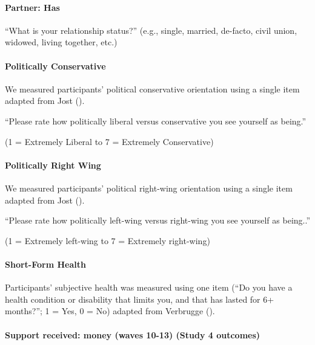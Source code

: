 \documentclass[
  single column]{article}
\let\oldparagraph\paragraph
\renewcommand{\paragraph}[1]{\oldparagraph{#1}\mbox{}}
\begin{document}
\paragraph{Partner: Has}\label{partner-has}

``What is your relationship status?'' (e.g., single, married, de-facto,
civil union, widowed, living together, etc.)

\paragraph{Politically Conservative}\label{politically-conservative}

We measured participants' political conservative orientation using a
single item adapted from Jost ().

``Please rate how politically liberal versus conservative you see
yourself as being.''

(1 = Extremely Liberal to 7 = Extremely Conservative)

\paragraph{Politically Right Wing}\label{politically-right-wing}

We measured participants' political right-wing orientation using a
single item adapted from Jost ().

``Please rate how politically left-wing versus right-wing you see
yourself as being..''

(1 = Extremely left-wing to 7 = Extremely right-wing)

\paragraph{Short-Form Health}\label{short-form-health}

Participants' subjective health was measured using one item (``Do you
have a health condition or disability that limits you, and that has
lasted for 6+ months?''; 1 = Yes, 0 = No) adapted from Verbrugge
().

\paragraph{Support received: money (waves 10-13) (Study 4
outcomes)}\label{support-received-money-waves-10-13-study-4-outcomes}
\end{document}
